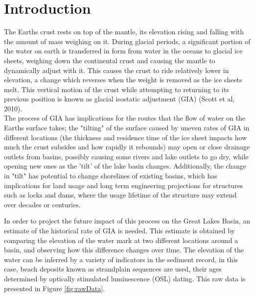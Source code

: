 \documentclass{article}
\begin{document}


\tableofcontents
\newpage


\newpage

\section{Introduction}
 The Earths crust rests on top of the mantle, its elevation rising and falling
 with the amount of mass weighing on it. During glacial periods, a significant portion
 of the water on earth is transferred in form from water in the oceans to glacial ice sheets,
 weighing down the continental crust and causing the mantle to dynamically adjust
 with it. This causes the crust to ride relatively lower in elevation,
 a change which reverses when the weight is removed as the ice sheets melt.
 This vertical motion of the crust while attempting to returning to its previous position is known
 as glacial isostatic adjustment (GIA) (Scott et al, 2010).\\
 
 The process of GIA has implications for the routes that the flow
 of water on the Earths surface takes; the "tilting" of the surface caused by 
 uneven rates of GIA in different locations (the thickness and residence time of
 the ice sheet impacts how much the crust subsides and how rapidly it rebounds) 
 may open or close drainage outlets from basins, possibly
 causing some rivers and lake outlets to go dry, while opening new ones as the
 'tilt' of the lake basin changes.
 Additionally, the change in "tilt" has potential to change shorelines of existing
 basins, which has implications for land usage and long term engineering
 projections for structures such as locks and dams, where the usage lifetime of
 the structure may extend over decades or centuries.\\

\newpage

 
 In order to project the future impact of this process on the Great Lakes Basin,
 an estimate of the historical rate of GIA is needed. This estimate is obtained by
 comparing the elevation of the water mark at two different locations around a basin, and
 observing how this difference changes over time. The elevation of the water can be inferred
 by a variety of indicators in the sediment record, in this case, beach deposits known
 as strandplain sequences are used, their ages determined by optically stimulated
 luminescence (OSL) dating. This raw data is presented in Figure \ref{fig:rawData}.\\

\end{document}
